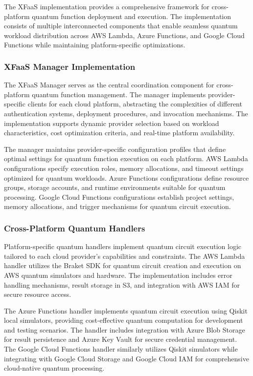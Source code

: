 \documentclass[onecolumn]{IEEEtran}
\begin{document}
The XFaaS implementation provides a comprehensive framework for cross-platform quantum function deployment and execution. The implementation consists of multiple interconnected components that enable seamless quantum workload distribution across AWS Lambda, Azure Functions, and Google Cloud Functions while maintaining platform-specific optimizations.

\subsubsection{XFaaS Manager Implementation}

The XFaaS Manager serves as the central coordination component for cross-platform quantum function management. The manager implements provider-specific clients for each cloud platform, abstracting the complexities of different authentication systems, deployment procedures, and invocation mechanisms. The implementation supports dynamic provider selection based on workload characteristics, cost optimization criteria, and real-time platform availability.

The manager maintains provider-specific configuration profiles that define optimal settings for quantum function execution on each platform. AWS Lambda configurations specify execution roles, memory allocations, and timeout settings optimized for quantum workloads. Azure Functions configurations define resource groups, storage accounts, and runtime environments suitable for quantum processing. Google Cloud Functions configurations establish project settings, memory allocations, and trigger mechanisms for quantum circuit execution.

\subsubsection{Cross-Platform Quantum Handlers}

Platform-specific quantum handlers implement quantum circuit execution logic tailored to each cloud provider's capabilities and constraints. The AWS Lambda handler utilizes the Braket SDK for quantum circuit creation and execution on AWS quantum simulators and hardware. The implementation includes error handling mechanisms, result storage in S3, and integration with AWS IAM for secure resource access.

The Azure Functions handler implements quantum circuit execution using Qiskit local simulators, providing cost-effective quantum computation for development and testing scenarios. The handler includes integration with Azure Blob Storage for result persistence and Azure Key Vault for secure credential management. The Google Cloud Functions handler similarly utilizes Qiskit simulators while integrating with Google Cloud Storage and Google Cloud IAM for comprehensive cloud-native quantum processing.
\end{document}
